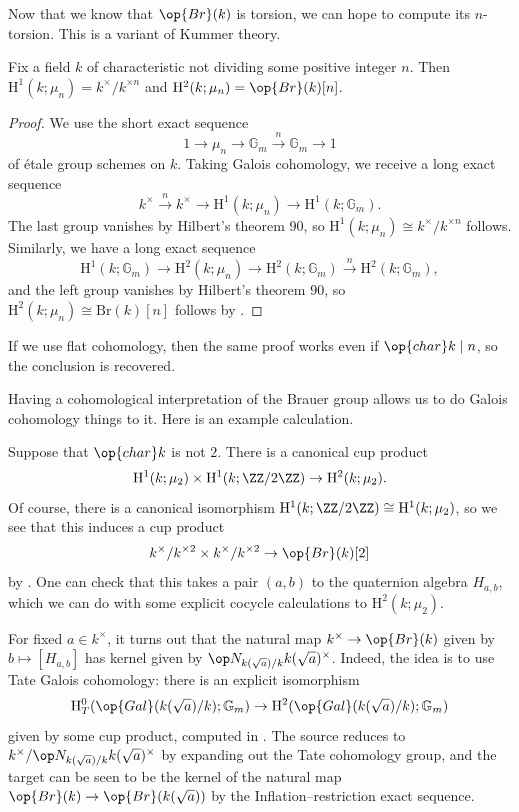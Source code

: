 \documentclass[../notes.tex]{subfiles}
\begin{document}
Now that we know that $\op{Br}(k)$ is torsion, we can hope to compute its $n$-torsion. This is a variant of Kummer theory.
\begin{proposition} \label{prop:kummer}
	Fix a field $k$ of characteristic not dividing some positive integer $n$. Then $\mathrm H^1(k;\mu_n)=k^\times/k^{\times n}$ and $\mathrm H^2(k;\mu_n)=\op{Br}(k)[n]$.
\end{proposition}
\begin{proof}
	We use the short exact sequence
	\[1\to\mu_n\to\mathbb G_m\stackrel n\to\mathbb G_m\to1\]
	of \'etale group schemes on $k$. Taking Galois cohomology, we receive a long exact sequence
	\[k^\times\stackrel n\to k^\times\to\mathrm H^1(k;\mu_n)\to\mathrm H^1(k;\mathbb G_m).\]
	The last group vanishes by Hilbert's theorem 90, so $\mathrm H^1(k;\mu_n)\cong k^\times/k^{\times n}$ follows. Similarly, we have a long exact sequence
	\[\mathrm H^1(k;\mathbb G_m)\to\mathrm H^2(k;\mu_n)\to\mathrm H^2(k;\mathbb G_m)\stackrel n\to\mathrm H^2(k;\mathbb G_m),\]
	and the left group vanishes by Hilbert's theorem 90, so $\mathrm H^2(k;\mu_n)\cong\mathrm{Br}(k)[n]$ follows by .
\end{proof}
\begin{remark}
	If we use flat cohomology, then the same proof works even if $\op{char}k\mid n$, so the conclusion is recovered.
\end{remark}
Having a cohomological interpretation of the Brauer group allows us to do Galois cohomology things to it. Here is an example calculation.
\begin{example} \label{ex:quaternion-by-cup}
	Suppose that $\op{char}k$ is not $2$. There is a canonical cup product
	\[\mathrm H^1(k;\mu_2)\times\mathrm H^1(k;\ZZ/2\ZZ)\to\mathrm H^2(k;\mu_2).\]
	Of course, there is a canonical isomorphism $\mathrm H^1(k;\ZZ/2\ZZ)\cong\mathrm H^1(k;\mu_2)$, so we see that this induces a cup product
	\[k^\times/k^{\times2}\times k^\times/k^{\times2}\to\op{Br}(k)[2]\]
	by . One can check that this takes a pair $(a,b)$ to the quaternion algebra $H_{a,b}$, which we can do with some explicit cocycle calculations to $\mathrm H^2(k;\mu_2)$.
\end{example}
\begin{remark}
	For fixed $a\in k^\times$, it turns out that the natural map $k^\times\to\op{Br}(k)$ given by $b\mapsto[H_{a,b}]$ has kernel given by $\op N_{k(\sqrt a)/k}k(\sqrt a)^\times$. Indeed, the idea is to use Tate Galois cohomology: there is an explicit isomorphism
	\[\mathrm H^0_T(\op{Gal}(k(\sqrt a)/k);\mathbb G_m)\to\mathrm H^2(\op{Gal}(k(\sqrt a)/k);\mathbb G_m)\]
	given by some cup product, computed in . The source reduces to $k^\times/\op N_{k(\sqrt a)/k}k(\sqrt a)^\times$ by expanding out the Tate cohomology group, and the target can be seen to be the kernel of the natural map $\op{Br}(k)\to\op{Br}(k(\sqrt a))$ by the Inflation--restriction exact sequence.
\end{remark}
\end{document}
